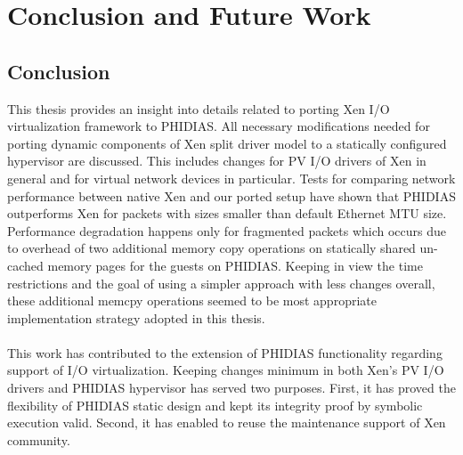 \chapter{Conclusion and Future Work\label{cha:chapter8}}

\section{Conclusion \label{sec:Conclusion}}
This thesis provides an insight into details related to porting Xen I/O virtualization framework to PHIDIAS. All necessary modifications needed for porting dynamic components of Xen split driver model to a statically configured hypervisor are discussed. This includes changes for PV I/O drivers of Xen in general and for virtual network devices in particular. Tests for comparing network performance between native Xen and our ported setup have shown that PHIDIAS outperforms Xen for packets with sizes smaller than default Ethernet MTU size. Performance degradation happens only for fragmented packets which occurs due to overhead of two additional memory copy operations on statically shared un-cached memory pages for the guests on PHIDIAS. Keeping in view the time restrictions and the goal of using a simpler approach with less changes overall, these additional memcpy operations seemed to be most appropriate implementation strategy adopted in this thesis.
\\
\\
This work has contributed to the extension of PHIDIAS functionality regarding support of I/O virtualization. 
Keeping changes minimum in both Xen's PV I/O drivers and PHIDIAS hypervisor has served two purposes. First, it has proved the flexibility of PHIDIAS static design and kept its integrity proof by symbolic execution valid. Second, it has enabled to reuse the maintenance support of Xen community.

